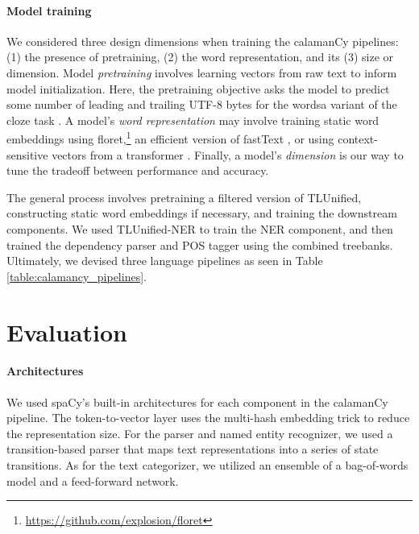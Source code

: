 \documentclass[11pt]{article}
\begin{document}






\paragraph*{Model training}

We considered three design dimensions when training the calamanCy pipelines: (1) the presence of pretraining, (2) the word representation, and its (3) size or dimension.
Model \textit{pretraining} involves learning vectors from raw text to inform model initialization.
Here, the pretraining objective asks the model to predict some number of leading and trailing UTF-8 bytes for the words\textemdash a variant of the cloze task \citep{Devlin2019BERTPO}.
A model's \textit{word representation} may involve training static word embeddings using floret,\footnote[3]{\url{https://github.com/explosion/floret}} an efficient version of fastText \citep{Bojanowski2016EnrichingWV}, or using context-sensitive vectors from a transformer \citep{Vaswani2017AttentionIA}.
Finally, a model's \textit{dimension} is our way to tune the tradeoff between performance and accuracy.

The general process involves pretraining a filtered version of TLUnified, constructing static word embeddings if necessary, and training the downstream components.
We used TLUnified-NER to train the NER component, and then trained the dependency parser and POS tagger using the combined treebanks.
Ultimately, we devised three language pipelines as seen in Table \ref{table:calamancy_pipelines}.

\section{Evaluation}



\paragraph*{Architectures}

We used spaCy's built-in architectures for each component in the calamanCy pipeline.
The token-to-vector layer uses the multi-hash embedding trick \citep{Miranda2022MultiHE} to reduce the representation size.
For the parser and named entity recognizer, we used a transition-based parser that maps text representations into a series of state transitions.
As for the text categorizer, we utilized an ensemble of a bag-of-words model and a feed-forward network.
\end{document}
